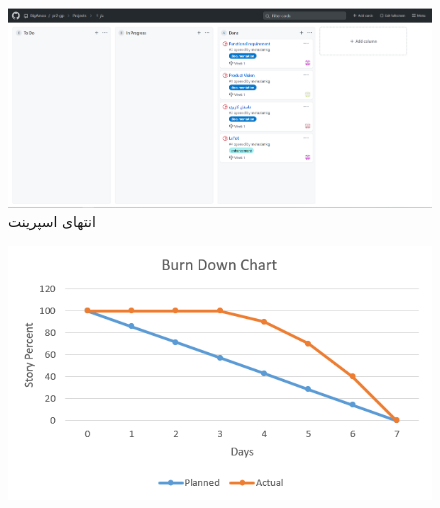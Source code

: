 \documentclass[12pt,a4paper]{article}
\begin{document}
	\begin{figure}[h!]
		\begin{center}
			\includegraphics[width=14cm]{images/screenshot_2.png}
		\end{center}
		\caption{انتهای اسپرینت}
	\end{figure}


	\begin{figure}[h!]
	\begin{center}
		\includegraphics[width=14cm]{images/Burn Down Chart.png}
		
	\end{center}
	\caption{}
\end{figure}
\end{document}
